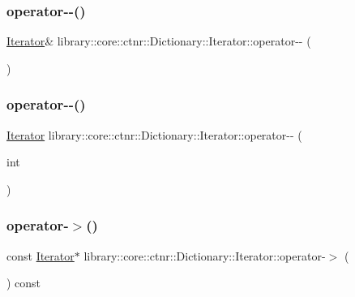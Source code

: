 \subsubsection{\texorpdfstring{operator-\/-\/()}{operator--()}\hspace{0.1cm}{\footnotesize\ttfamily [1/2]}}
{\footnotesize\ttfamily \hyperlink{classlibrary_1_1core_1_1ctnr_1_1Dictionary_1_1Iterator}{Iterator}\& library\+::core\+::ctnr\+::\+Dictionary\+::\+Iterator\+::operator-\/-\/ (\begin{DoxyParamCaption}{ }\end{DoxyParamCaption})}

\mbox{\label{classlibrary_1_1core_1_1ctnr_1_1Dictionary_1_1Iterator_a0e6049d9ccc80f1b0775cd5a3aff1983}} 
\subsubsection{\texorpdfstring{operator-\/-\/()}{operator--()}\hspace{0.1cm}{\footnotesize\ttfamily [2/2]}}
{\footnotesize\ttfamily \hyperlink{classlibrary_1_1core_1_1ctnr_1_1Dictionary_1_1Iterator}{Iterator} library\+::core\+::ctnr\+::\+Dictionary\+::\+Iterator\+::operator-\/-\/ (\begin{DoxyParamCaption}\item[{int}]{ }\end{DoxyParamCaption})}

\mbox{\label{classlibrary_1_1core_1_1ctnr_1_1Dictionary_1_1Iterator_ab0d2327725731d62770ae87f3b5b6003}} 
\subsubsection{\texorpdfstring{operator-\/$>$()}{operator->()}\hspace{0.1cm}{\footnotesize\ttfamily [1/2]}}
{\footnotesize\ttfamily const \hyperlink{classlibrary_1_1core_1_1ctnr_1_1Dictionary_1_1Iterator}{Iterator}$\ast$ library\+::core\+::ctnr\+::\+Dictionary\+::\+Iterator\+::operator-\/$>$ (\begin{DoxyParamCaption}{ }\end{DoxyParamCaption}) const}

